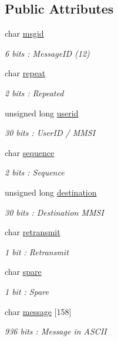 \subsection*{Public Attributes}
\begin{DoxyCompactItemize}
\item 
char \mbox{\hyperlink{structaismsg__12_a8b3dee970f26be48e167ae72d8245a0b}{msgid}}
\begin{DoxyCompactList}\small\item\em 6 bits \+: Message\+ID (12) \end{DoxyCompactList}\item 
char \mbox{\hyperlink{structaismsg__12_a7919c4fdbbdf43619c625df928e32ead}{repeat}}
\begin{DoxyCompactList}\small\item\em 2 bits \+: Repeated \end{DoxyCompactList}\item 
unsigned long \mbox{\hyperlink{structaismsg__12_a13279b63437d173caf794365a318aea9}{userid}}
\begin{DoxyCompactList}\small\item\em 30 bits \+: User\+ID / M\+M\+SI \end{DoxyCompactList}\item 
char \mbox{\hyperlink{structaismsg__12_af8ed3f3c3bfb11a8d16589fbe815155e}{sequence}}
\begin{DoxyCompactList}\small\item\em 2 bits \+: Sequence \end{DoxyCompactList}\item 
unsigned long \mbox{\hyperlink{structaismsg__12_a884b03b535b98aa254e1d37ed9c2ed5b}{destination}}
\begin{DoxyCompactList}\small\item\em 30 bits \+: Destination M\+M\+SI \end{DoxyCompactList}\item 
char \mbox{\hyperlink{structaismsg__12_a4220a4c65c732e998a9dd9f7b831268b}{retransmit}}
\begin{DoxyCompactList}\small\item\em 1 bit \+: Retransmit \end{DoxyCompactList}\item 
char \mbox{\hyperlink{structaismsg__12_af85023b905d3755d9b7318e01cf0c899}{spare}}
\begin{DoxyCompactList}\small\item\em 1 bit \+: Spare \end{DoxyCompactList}\item 
char \mbox{\hyperlink{structaismsg__12_a7f5612e9f1e4b3184d4515a373234fe9}{message}} \mbox{[}158\mbox{]}
\begin{DoxyCompactList}\small\item\em 936 bits \+: Message in A\+S\+C\+II \end{DoxyCompactList}\end{DoxyCompactItemize}


